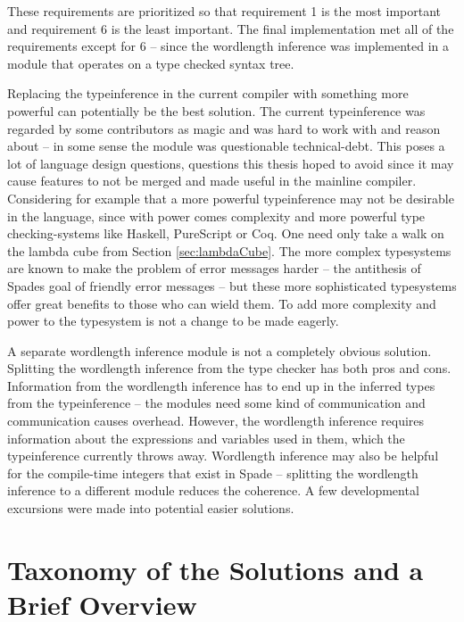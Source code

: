 These requirements are prioritized so that requirement 1 is the most important and requirement 6 is the least important. The final implementation met all of the requirements except for 6 -- since the wordlength inference was implemented in a module that operates on a type checked syntax tree.

Replacing the typeinference in the current compiler with something more powerful can potentially be the best solution. The current typeinference was regarded by some contributors as magic and was hard to work with and reason about -- in some sense the module was questionable technical-debt. This poses a lot of language design questions, questions this thesis hoped to avoid since it may cause features to not be merged and made useful in the mainline compiler. Considering for example that a more powerful typeinference may not be desirable in the language, since with power comes complexity and more powerful type checking-systems like Haskell, PureScript or Coq. One need only take a walk on the lambda cube from Section \ref{sec:lambdaCube}. The more complex typesystems are known to make the problem of error messages harder -- the antithesis of Spades goal of friendly error messages -- but these more sophisticated typesystems offer great benefits to those who can wield them. To add more complexity and power to the typesystem is not a change to be made eagerly.

A separate wordlength inference module is not a completely obvious solution. Splitting the wordlength inference from the type checker has both pros and cons. Information from the wordlength inference has to end up in the inferred types from the typeinference -- the modules need some kind of communication and communication causes overhead. However, the wordlength inference requires information about the expressions and variables used in them, which the typeinference currently throws away. Wordlength inference may also be helpful for the compile-time integers that exist in Spade -- splitting the wordlength inference to a different module reduces the coherence. A few developmental excursions were made into potential easier solutions.

\section{Taxonomy of the Solutions and a Brief Overview}

